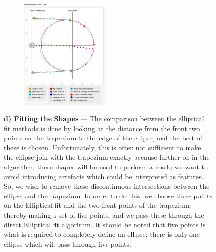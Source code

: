 \begin{figure}[p!]
\ContinuedFloat
\centering
\begin{minipage}[t]{1\textwidth}
\begin{figure}
  \begin{center}
    \includegraphics[width=0.48\textwidth]{Chapter4/Figs/Model_ShapeFitting_FSkin_Little.jpg}
  \end{center}
\end{figure}
         \textbf{d) Fitting the Shapes} --- The comparison between the elliptical fit methods is done by looking at the distance from the front two points on the trapezium to the edge of the ellipse, and the best of these is chosen. Unfortunately, this is often not sufficient to make the ellipse join with the trapezium exactly because further on in the algorithm, these shapes will be used to perform a mask; we want to avoid introducing artefacts which could be interpreted as features. So, we wish to remove these discontinuous intersections between the ellipse and the trapezium. In order to do this, we choose three points on the Elliptical fit and the two front points of the trapezium, thereby making a set of five points, and we pass these through the direct Elliptical fit algorithm. It should be noted that five points is what is required to completely define an ellipse; there is only one ellipse which will pass through five points.
    \end{minipage}
    \\

\end{figure}
